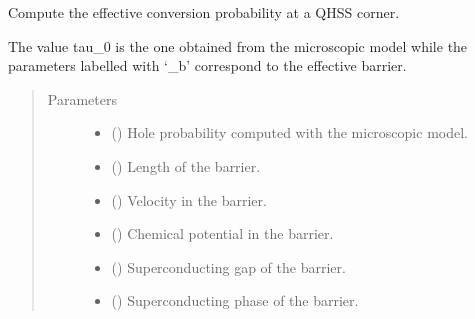 \documentclass[letterpaper,10pt,english]{sphinxmanual}
\begin{document}

\begin{fulllineitems}
\label{\detokenize{modules:modules.functions.effective_tau}}
\pysigstartsignatures
{}
\pysigstopsignatures
\sphinxAtStartPar
Compute the effective conversion probability at a QH\sphinxhyphen{}SS corner.

\sphinxAtStartPar
The value tau\_0 is the one obtained from the microscopic model while the parameters
labelled with ‘\_b’ correspond to the effective barrier.
\begin{quote}\begin{description}
\item[{Parameters}] \leavevmode\begin{itemize}
\item {} 
\sphinxAtStartPar
{} () \textendash{} Hole probability computed with the microscopic model.

\item {} 
\sphinxAtStartPar
{} () \textendash{} Length of the barrier.

\item {} 
\sphinxAtStartPar
{} () \textendash{} Velocity in the barrier.

\item {} 
\sphinxAtStartPar
{} () \textendash{} Chemical potential in the barrier.

\item {} 
\sphinxAtStartPar
{} () \textendash{} Superconducting gap of the barrier.

\item {} 
\sphinxAtStartPar
{} () \textendash{} Superconducting phase of the barrier.

\end{itemize}

\end{description}\end{quote}

\end{fulllineitems}
\end{document}
